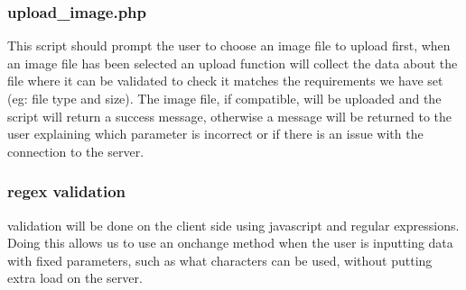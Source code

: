 	\subsubsection{upload\_image.php}
		This script should prompt the user to choose an image file to upload first, when an image file has been selected an upload function will collect the data about the file where it can be validated to check it matches the requirements we have set (eg: file type and size). The image file, if compatible, will be uploaded and the script will return a success message, otherwise a message will be returned to the user explaining which parameter is incorrect or if there is an issue with the connection to the server.

	\subsubsection{regex validation}
		validation will be done on the client side using javascript and regular expressions. Doing this allows us to use an onchange method when the user is inputting data with fixed parameters, such as what characters can be used, without putting extra load on the server.
